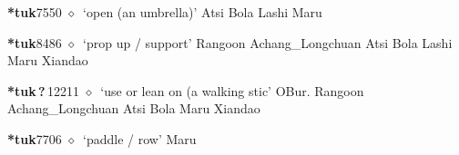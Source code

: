   \begin{list}{}{\leftmargin=1.5em \itemindent=-1.5em}
  \item {\footnotesize \textbf{*tuk}}{\tiny 7550}
         $\diamond$~`open (an umbrella)'
         Atsi 
\hspace{1ex}
         Bola 
\hspace{1ex}
         Lashi 
\hspace{1ex}
         Maru 
  \item {\footnotesize \textbf{*tuk}}{\tiny 8486}
\hspace{1ex}
         $\diamond$~`prop up / support'
         Rangoon 
\hspace{1ex}
         Achang\_Longchuan 
\hspace{1ex}
         Atsi 
\hspace{1ex}
         Bola 
\hspace{1ex}
         Lashi 
\hspace{1ex}
         Maru 
\hspace{1ex}
         Xiandao 
  \item {\footnotesize \textbf{*tuk\,?\,}}{\tiny 12211}
\hspace{1ex}
         $\diamond$~`use or lean on (a walking stic'
         OBur. 
\hspace{1ex}
         Rangoon 
\hspace{1ex}
         Achang\_Longchuan 
\hspace{1ex}
         Atsi 
\hspace{1ex}
         Bola 
\hspace{1ex}
         Maru 
\hspace{1ex}
         Xiandao 
  \item {\footnotesize \textbf{*tuk}}{\tiny 7706}
\hspace{1ex}
         $\diamond$~`paddle / row'
         Maru 
  \end{list}
